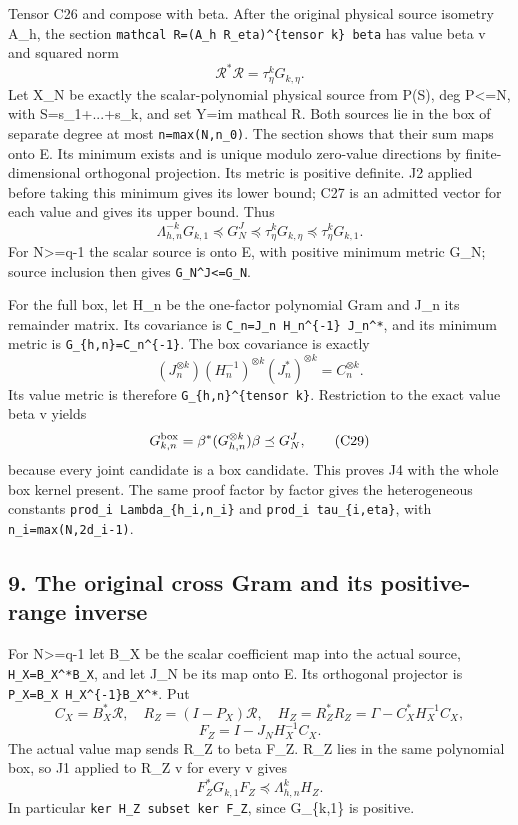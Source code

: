 Tensor C26 and compose with beta. After the original physical source isometry A\_h, the section \texttt{mathcal\ R=(A\_h\ R\_eta)\^{}\{tensor\ k\}\ beta} has value beta v and squared norm \[
\mathcal R^*\mathcal R=\tau_\eta^kG_{k,\eta}.
\tag{C27}
\] Let X\_N be exactly the scalar-polynomial physical source from P(S), deg P\textless=N, with S=s\_1+...+s\_k, and set Y=im mathcal R. Both sources lie in the box of separate degree at most \texttt{n=max(N,n\_0)}. The section shows that their sum maps onto E. Its minimum exists and is unique modulo zero-value directions by finite-dimensional orthogonal projection. Its metric is positive definite. J2 applied before taking this minimum gives its lower bound; C27 is an admitted vector for each value and gives its upper bound. Thus \[
\Lambda_{h,n}^{-k}G_{k,1}\preceq G_N^J
\preceq\tau_\eta^kG_{k,\eta}\preceq\tau_\eta^kG_{k,1}.
\tag{C28}
\] For N\textgreater=q-1 the scalar source is onto E, with positive minimum metric G\_N; source inclusion then gives \texttt{G\_N\^{}J\textless{}=G\_N}.

For the full box, let H\_n be the one-factor polynomial Gram and J\_n its remainder matrix. Its covariance is \texttt{C\_n=J\_n\ H\_n\^{}\{-1\}\ J\_n\^{}*}, and its minimum metric is \texttt{G\_\{h,n\}=C\_n\^{}\{-1\}}. The box covariance is exactly \[
(J_n^{\otimes k})(H_n^{-1})^{\otimes k}(J_n^*)^{\otimes k}
=C_n^{\otimes k}.
\] Its value metric is therefore \texttt{G\_\{h,n\}\^{}\{tensor\ k\}}. Restriction to the exact value beta v yields \[
G_{k,n}^{\rm box}=\beta^*(G_{h,n}^{\otimes k})\beta\preceq G_N^J,
\tag{C29}
\] because every joint candidate is a box candidate. This proves J4 with the whole box kernel present. The same proof factor by factor gives the heterogeneous constants \texttt{prod\_i\ Lambda\_\{h\_i,n\_i\}} and \texttt{prod\_i\ tau\_\{i,eta\}}, with \texttt{n\_i=max(N,2d\_i-1)}.

\subsection{9. The original cross Gram and its positive-range inverse}\label{mrcoerc:the-original-cross-gram-and-its-positive-range-inverse}

For N\textgreater=q-1 let B\_X be the scalar coefficient map into the actual source, \texttt{H\_X=B\_X\^{}*B\_X}, and let J\_N be its map onto E. Its orthogonal projector is \texttt{P\_X=B\_X\ H\_X\^{}\{-1\}B\_X\^{}*}. Put \[
C_X=B_X^*\mathcal R,\quad
R_Z=(I-P_X)\mathcal R,\quad
H_Z=R_Z^*R_Z=\Gamma-C_X^*H_X^{-1}C_X,
\] \[
F_Z=I-J_NH_X^{-1}C_X.
\tag{C30}
\] The actual value map sends R\_Z to beta F\_Z. R\_Z lies in the same polynomial box, so J1 applied to R\_Z v for every v gives \[
F_Z^*G_{k,1}F_Z\preceq\Lambda_{h,n}^kH_Z.
\tag{C31}
\] In particular \texttt{ker\ H\_Z\ subset\ ker\ F\_Z}, since G\_\{k,1\} is positive.


